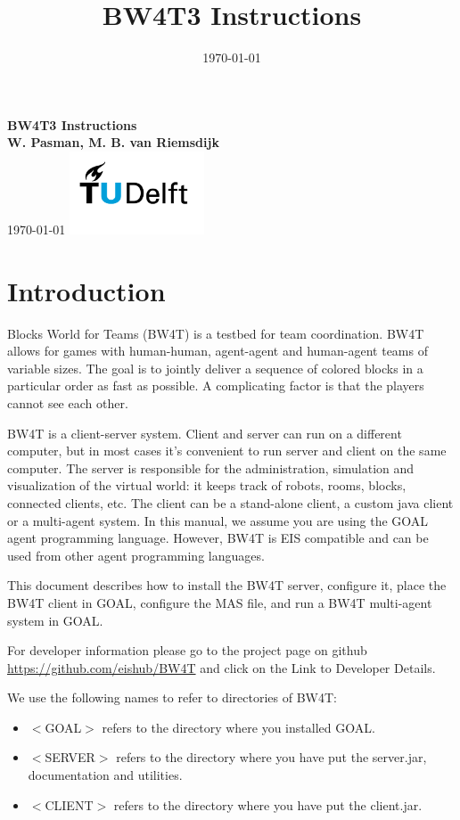 \documentclass[11pt,a4paper]{article}
\title{BW4T3 Instructions}
\date{\today}
\begin{document}
\begin{titlepage}
    \centering
    \vfill
    {\bfseries\Large
        BW4T3 Instructions\\
        \vskip2cm
        W. Pasman, M. B. van Riemsdijk\\
    } 
    \vskip1cm
    \today   
    \vfill
    \includegraphics[width=4cm]{TUD.png}
    \vfill
    \vfill
\end{titlepage}

\tableofcontents

\newpage

\section{Introduction}
Blocks World for Teams (BW4T) is a testbed for team coordination. BW4T allows for games with human-human, agent-agent and human-agent teams of variable sizes. The goal is to jointly deliver a sequence of colored blocks in a particular order as fast as possible. A complicating factor is that the players cannot see each other.

BW4T is a client-server system. Client and server can run on a different computer, but in most cases it's convenient to run server and client on the same computer. The server is responsible for the administration, simulation and visualization of the virtual world: it keeps track of robots, rooms, blocks, connected clients, etc. The client can be a stand-alone client, a custom java client or a multi-agent system. In this manual, we assume you are using the GOAL agent programming language. However, BW4T is EIS compatible and can be used from other agent programming languages.

This document describes how to install the BW4T server, configure it, place the BW4T client in GOAL, configure the MAS file, and run a BW4T multi-agent system in GOAL.

For developer information please go to the project page on github  \url{https://github.com/eishub/BW4T} and click on the Link to Developer Details.

We use the following names to refer to directories of BW4T:
\begin{itemize}
\item $<$GOAL$>$ refers to the directory where you installed GOAL.
\item $<$SERVER$>$ refers to the directory where you have put the server.jar, documentation and utilities.
\item $<$CLIENT$>$ refers to the directory where you have put the client.jar.
\end{itemize}
\end{document}
